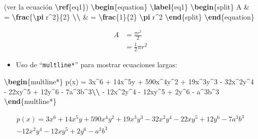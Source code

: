 \documentclass[12pt,a4paper,]{book}
\newenvironment{Shaded}{\begin{snugshade}}{\end{snugshade}}
\newcommand{\ExtensionTok}[1]{#1}
\newcommand{\KeywordTok}[1]{\textcolor[rgb]{0.13,0.29,0.53}{\textbf{#1}}}
\newcommand{\NormalTok}[1]{#1}
\newcommand{\SpecialCharTok}[1]{\textcolor[rgb]{0.81,0.36,0.00}{\textbf{#1}}}
\newcommand{\SpecialStringTok}[1]{\textcolor[rgb]{0.31,0.60,0.02}{#1}}
\providecommand{\tightlist}{%
  \setlength{\itemsep}{0pt}\setlength{\parskip}{0pt}}
\numberwithin{dummy}{section}
\theoremstyle{ocrenumbox}
\theoremstyle{blacknumex}
\theoremstyle{blacknumbox}
\theoremstyle{ocrenum}
\theoremstyle{ocrenum}
\begin{document}
\begin{Shaded}
\begin{Highlighting}[]
\NormalTok{(ver la ecuación }\KeywordTok{\textbackslash{}ref}\NormalTok{\{}\ExtensionTok{eq1}\NormalTok{\})}
\KeywordTok{\textbackslash{}begin}\NormalTok{\{}\ExtensionTok{equation}\NormalTok{\}}\SpecialStringTok{ }\SpecialCharTok{\textbackslash{}label}\SpecialStringTok{\{eq1\}}
\KeywordTok{\textbackslash{}begin}\NormalTok{\{}\ExtensionTok{split}\NormalTok{\}}
\SpecialStringTok{A \& = }\SpecialCharTok{\textbackslash{}frac}\SpecialStringTok{\{}\SpecialCharTok{\textbackslash{}pi}\SpecialStringTok{ r\^{}2\}\{2\} }\SpecialCharTok{\textbackslash{}\textbackslash{}}
\SpecialStringTok{ \& = }\SpecialCharTok{\textbackslash{}frac}\SpecialStringTok{\{1\}\{2\} }\SpecialCharTok{\textbackslash{}pi}\SpecialStringTok{ r\^{}2}
\KeywordTok{\textbackslash{}end}\NormalTok{\{}\ExtensionTok{split}\NormalTok{\}}
\KeywordTok{\textbackslash{}end}\NormalTok{\{}\ExtensionTok{equation}\NormalTok{\}}
\end{Highlighting}
\end{Shaded}

\begin{equation} \label{eq1}
\begin{split}
A & = \frac{\pi r^2}{2} \\
 & = \frac{1}{2} \pi r^2
\end{split}
\end{equation}

\begin{itemize}
\tightlist
\item
  Uso de ``\texttt{multline*}'' para mostrar ecuaciones largas:
\end{itemize}

\begin{Shaded}
\begin{Highlighting}[]
\KeywordTok{\textbackslash{}begin}\NormalTok{\{}\ExtensionTok{multline*}\NormalTok{\}}
\SpecialStringTok{p(x) = 3x\^{}6 + 14x\^{}5y + 590x\^{}4y\^{}2 + 19x\^{}3y\^{}3 }
\SpecialStringTok{            {-} 32x\^{}2y\^{}4 {-} 22xy\^{}5 + 12y\^{}6 {-} 7a\^{}3b\^{}3}\SpecialCharTok{\textbackslash{}\textbackslash{}}\SpecialStringTok{ }
\SpecialStringTok{{-} 12x\^{}2y\^{}4 {-} 12xy\^{}5 + 2y\^{}6 {-} a\^{}3b\^{}3}
\KeywordTok{\textbackslash{}end}\NormalTok{\{}\ExtensionTok{multline*}\NormalTok{\}}
\end{Highlighting}
\end{Shaded}

\begin{multline*}
p(x) = 3x^6 + 14x^5y + 590x^4y^2 + 19x^3y^3 
            - 32x^2y^4 - 22xy^5 + 12y^6 - 7a^3b^3 \\ 
- 12x^2y^4 - 12xy^5 + 2y^6 - a^3b^3
\end{multline*}
\end{document}
